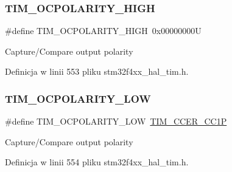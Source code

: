 \subsubsection{\texorpdfstring{T\+I\+M\+\_\+\+O\+C\+P\+O\+L\+A\+R\+I\+T\+Y\+\_\+\+H\+I\+GH}{TIM\_OCPOLARITY\_HIGH}}
{\footnotesize\ttfamily \#define T\+I\+M\+\_\+\+O\+C\+P\+O\+L\+A\+R\+I\+T\+Y\+\_\+\+H\+I\+GH~0x00000000U}

Capture/\+Compare output polarity 

Definicja w linii 553 pliku stm32f4xx\+\_\+hal\+\_\+tim.\+h.

\mbox{\label{group___t_i_m___output___compare___polarity_ga1daff1574b0a2d17ccc9ae40a649ac37}} 
\subsubsection{\texorpdfstring{T\+I\+M\+\_\+\+O\+C\+P\+O\+L\+A\+R\+I\+T\+Y\+\_\+\+L\+OW}{TIM\_OCPOLARITY\_LOW}}
{\footnotesize\ttfamily \#define T\+I\+M\+\_\+\+O\+C\+P\+O\+L\+A\+R\+I\+T\+Y\+\_\+\+L\+OW~\hyperlink{group___peripheral___registers___bits___definition_ga0ca0aedba14241caff739afb3c3ee291}{T\+I\+M\+\_\+\+C\+C\+E\+R\+\_\+\+C\+C1P}}

Capture/\+Compare output polarity 

Definicja w linii 554 pliku stm32f4xx\+\_\+hal\+\_\+tim.\+h.

